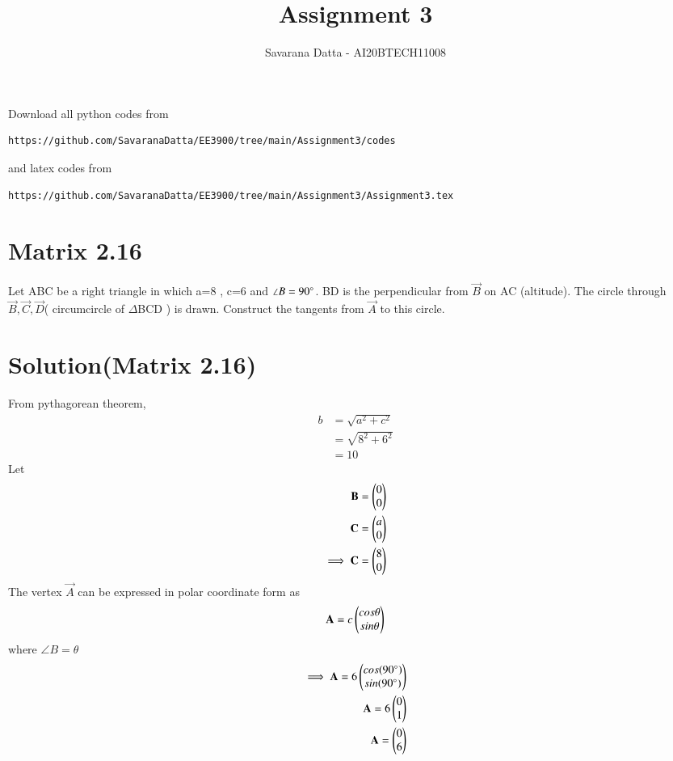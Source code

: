 \documentclass[journal,12pt,twocolumn]{IEEEtran}
\begin{document}
     \def\rightbox#1{\makebox[0in][r]{#1}}
     \def\centbox#1{\makebox[0in]{#1}}
     \def\topbox#1{\raisebox{-\baselineskip}[0in][0in]{#1}}
     \def\midbox#1{\raisebox{-0.5\baselineskip}[0in][0in]{#1}}
\vspace{3cm}
\title{ Assignment 3}
\author{Savarana Datta - AI20BTECH11008}
\maketitle
\newpage
\bigskip
\renewcommand{\thefigure}{\theenumi}
\renewcommand{\thetable}{\theenumi}
Download all python codes from 
\begin{lstlisting}
https://github.com/SavaranaDatta/EE3900/tree/main/Assignment3/codes
\end{lstlisting}
%
and latex codes from 
%
\begin{lstlisting}
https://github.com/SavaranaDatta/EE3900/tree/main/Assignment3/Assignment3.tex
\end{lstlisting}


\section{Matrix 2.16}
Let ABC be a right triangle in which a=8 , c=6 and $\angle B = 90 \degree$. BD is the perpendicular from $\vec{B}$ on AC (altitude). The circle through $\vec{B},\vec{C},\vec{D}$( circumcircle of $\Delta$BCD ) is drawn. Construct the tangents from $\vec{A}$ to this circle.

\section{Solution(Matrix 2.16)}
From pythagorean theorem,
\begin{align}
    b & = \sqrt{a^2+c^2}\\
      & = \sqrt{8^{2}+6^{2}}\\
      & = 10
\end{align}
Let
\begin{align}
    \mathbf{B} = \begin{pmatrix}0\\0\end{pmatrix}\\
    \mathbf{C} = \begin{pmatrix}a\\0\end{pmatrix}\\
    \implies \mathbf{C}=\begin{pmatrix}8\\0\end{pmatrix}
\end{align}
The vertex $\vec{A}$ can be expressed in polar coordinate form as
\begin{align}
    \mathbf{A} = c\begin{pmatrix}cos\theta\\sin\theta\end{pmatrix}
\end{align}
where $\angle B = \theta$
\begin{align}
    \implies \mathbf{A}=6\begin{pmatrix}cos(90\degree)\\sin(90\degree)\end{pmatrix}\\
    \mathbf{A}=6\begin{pmatrix}0\\1\end{pmatrix}\\
    \mathbf{A}=\begin{pmatrix}0\\6\end{pmatrix}
\end{align}
\end{document}
